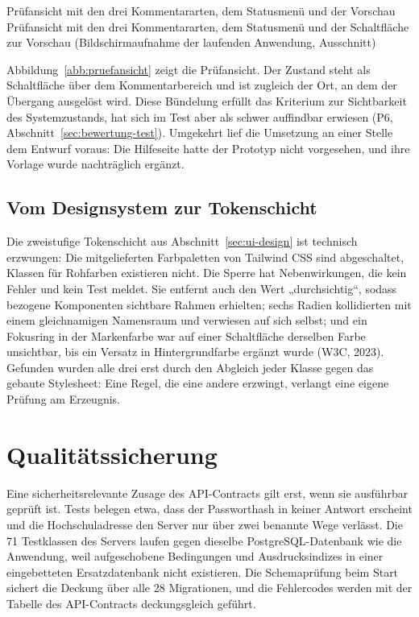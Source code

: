 %
{Prüfansicht mit den drei Kommentararten, dem Statusmenü und der Vorschau}%
{Prüfansicht mit den drei Kommentararten, dem Statusmenü und der Schaltfläche zur Vorschau (Bildschirmaufnahme der laufenden Anwendung, Ausschnitt)}

Abbildung~\ref{abb:pruefansicht} zeigt die Prüfansicht. Der Zustand steht als Schaltfläche über dem Kommentarbereich und ist zugleich der Ort, an dem der Übergang ausgelöst wird. Diese Bündelung erfüllt das Kriterium zur Sichtbarkeit des Systemzustands, hat sich im Test aber als schwer auffindbar erwiesen (P6, Abschnitt~\ref{sec:bewertung-test}). Umgekehrt lief die Umsetzung an einer Stelle dem Entwurf voraus: Die Hilfeseite hatte der Prototyp nicht vorgesehen, und ihre Vorlage wurde nachträglich ergänzt.

\subsection{Vom Designsystem zur Tokenschicht}
\label{subsec:tokenschicht}

Die zweistufige Tokenschicht aus Abschnitt~\ref{sec:ui-design} ist technisch erzwungen: Die mitgelieferten Farbpaletten von Tailwind CSS sind abgeschaltet, Klassen für Rohfarben existieren nicht. Die Sperre hat Nebenwirkungen, die kein Fehler und kein Test meldet. Sie entfernt auch den Wert „durchsichtig“, sodass bezogene Komponenten sichtbare Rahmen erhielten; sechs Radien kollidierten mit einem gleichnamigen Namensraum und verwiesen auf sich selbst; und ein Fokusring in der Markenfarbe war auf einer Schaltfläche derselben Farbe unsichtbar, bis ein Versatz in Hintergrundfarbe ergänzt wurde (W3C, 2023). Gefunden wurden alle drei erst durch den Abgleich jeder Klasse gegen das gebaute Stylesheet: Eine Regel, die eine andere erzwingt, verlangt eine eigene Prüfung am Erzeugnis.

\section{Qualitätssicherung}
\label{sec:qualitaetssicherung}

Eine sicherheitsrelevante Zusage des API-Contracts gilt erst, wenn sie ausführbar geprüft ist. Tests belegen etwa, dass der Passworthash in keiner Antwort erscheint und die Hochschuladresse den Server nur über zwei benannte Wege verlässt. Die 71 Testklassen des Servers laufen gegen dieselbe PostgreSQL-Datenbank wie die Anwendung, weil aufgeschobene Bedingungen und Ausdrucksindizes in einer eingebetteten Ersatzdatenbank nicht existieren. Die Schemaprüfung beim Start sichert die Deckung über alle 28 Migrationen, und die Fehlercodes werden mit der Tabelle des API-Contracts deckungsgleich geführt.

